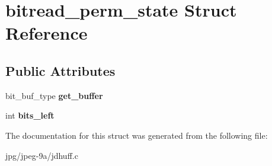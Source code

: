 \hypertarget{structbitread__perm__state}{\section{bitread\+\_\+perm\+\_\+state Struct Reference}
\label{structbitread__perm__state}
}
\subsection*{Public Attributes}
\begin{DoxyCompactItemize}
\item 
\hypertarget{structbitread__perm__state_a39dce6ef08822b3ae5c8ba2329d079bd}{bit\+\_\+buf\+\_\+type {\bfseries get\+\_\+buffer}}\label{structbitread__perm__state_a39dce6ef08822b3ae5c8ba2329d079bd}

\item 
\hypertarget{structbitread__perm__state_ac138b781f4681902dec2e44007f672c4}{int {\bfseries bits\+\_\+left}}\label{structbitread__perm__state_ac138b781f4681902dec2e44007f672c4}

\end{DoxyCompactItemize}


The documentation for this struct was generated from the following file\+:\begin{DoxyCompactItemize}
\item 
jpg/jpeg-\/9a/jdhuff.\+c\end{DoxyCompactItemize}

